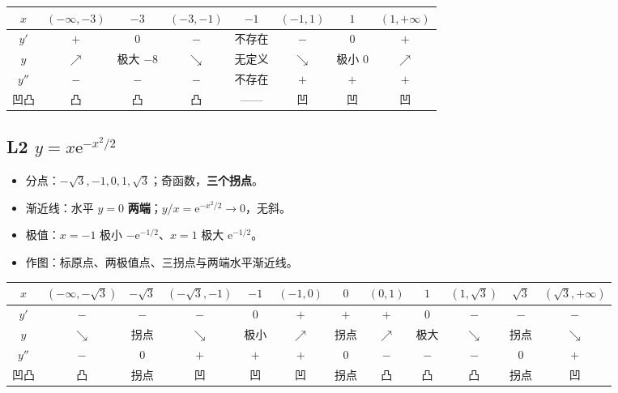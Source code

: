 \documentclass[11pt,a4paper]{ctexart}
\newcommand{\ee}{\mathrm{e}}
\begin{document}
\begin{center}
\footnotesize\setlength{\tabcolsep}{1.5pt}
\begin{tabular}{@{}c|ccccccc@{}}
$x$ & $(-\infty,-3)$ & $-3$ & $(-3,-1)$ & $-1$ & $(-1,1)$ & $1$ & $(1,+\infty)$ \\
\hline
$y'$ & $+$ & $0$ & $-$ & 不存在 & $-$ & $0$ & $+$ \\
$y$ & $\nearrow$ & 极大 $-8$ & $\searrow$ & 无定义 & $\searrow$ & 极小 $0$ & $\nearrow$ \\
$y''$ & $-$ & $-$ & $-$ & 不存在 & $+$ & $+$ & $+$ \\
凹凸 & 凸 & 凸 & 凸 & —— & 凹 & 凹 & 凹 \\
\end{tabular}
\end{center}

\subsection{L2 $y=x\ee^{-x^2/2}$}

\begin{itemize}[label=$\bullet$,leftmargin=1.5em]
\item 分点：$-\sqrt3,-1,0,1,\sqrt3$；奇函数，\textbf{三个拐点}。
\item 渐近线：水平 $y=0$ \textbf{两端}；$y/x=\ee^{-x^2/2}\to0$，无斜。
\item 极值：$x=-1$ 极小 $-\ee^{-1/2}$、$x=1$ 极大 $\ee^{-1/2}$。
\item 作图：标原点、两极值点、三拐点与两端水平渐近线。
\end{itemize}

\begin{center}
\footnotesize\setlength{\tabcolsep}{1.5pt}
\begin{tabular}{@{}c|ccccccccccc@{}}
$x$ & $(-\infty,-\sqrt3)$ & $-\sqrt3$ & $(-\sqrt3,-1)$ & $-1$ & $(-1,0)$ & $0$ & $(0,1)$ & $1$ & $(1,\sqrt3)$ & $\sqrt3$ & $(\sqrt3,+\infty)$ \\
\hline
$y'$ & $-$ & $-$ & $-$ & $0$ & $+$ & $+$ & $+$ & $0$ & $-$ & $-$ & $-$ \\
$y$ & $\searrow$ & 拐点 & $\searrow$ & 极小 & $\nearrow$ & 拐点 & $\nearrow$ & 极大 & $\searrow$ & 拐点 & $\searrow$ \\
$y''$ & $-$ & $0$ & $+$ & $+$ & $+$ & $0$ & $-$ & $-$ & $-$ & $0$ & $+$ \\
凹凸 & 凸 & 拐点 & 凹 & 凹 & 凹 & 拐点 & 凸 & 凸 & 凸 & 拐点 & 凹 \\
\end{tabular}
\end{center}
\end{document}
